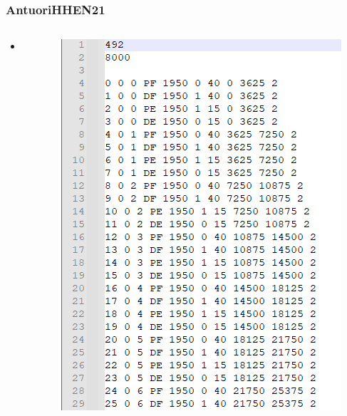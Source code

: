 \documentclass[dvipsnames,aspectratio=169]{beamer}
\begin{document}
\begin{frame}
\frametitle{AntuoriHHEN21 \cite{AntuoriHHEN21}}
\begin{columns}
\begin{column}{0.5\textwidth}
\begin{itemize}
\item
\end{itemize}
\end{column}
\begin{column}{0.5\textwidth}
\includegraphics[width=.8\textwidth]{images/AntuoriHHEN21}
\end{column}
\end{columns}
\end{frame}
\end{document}

